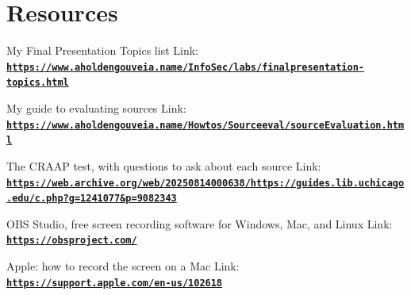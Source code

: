 \documentclass[12pt]{article}
\begin{document}
\section*{Resources}
My Final Presentation Topics list
Link: \href{https://www.aholdengouveia.name/InfoSec/labs/finalpresentation-topics.html}{\textbf{\nolinkurl{https://www.aholdengouveia.name/InfoSec/labs/finalpresentation-topics.html}}}

My guide to evaluating sources
Link: \href{https://www.aholdengouveia.name/Howtos/Sourceeval/sourceEvaluation.html}{\textbf{\nolinkurl{https://www.aholdengouveia.name/Howtos/Sourceeval/sourceEvaluation.html}}}

The CRAAP test, with questions to ask about each source
Link: \href{https://web.archive.org/web/20250814000638/https://guides.lib.uchicago.edu/c.php?g=1241077&p=9082343}{\textbf{\nolinkurl{https://web.archive.org/web/20250814000638/https://guides.lib.uchicago.edu/c.php?g=1241077&p=9082343}}}

OBS Studio, free screen recording software for Windows, Mac, and Linux
Link: \href{https://obsproject.com/}{\textbf{\nolinkurl{https://obsproject.com/}}}

Apple: how to record the screen on a Mac
Link: \href{https://support.apple.com/en-us/102618}{\textbf{\nolinkurl{https://support.apple.com/en-us/102618}}}
\end{document}

